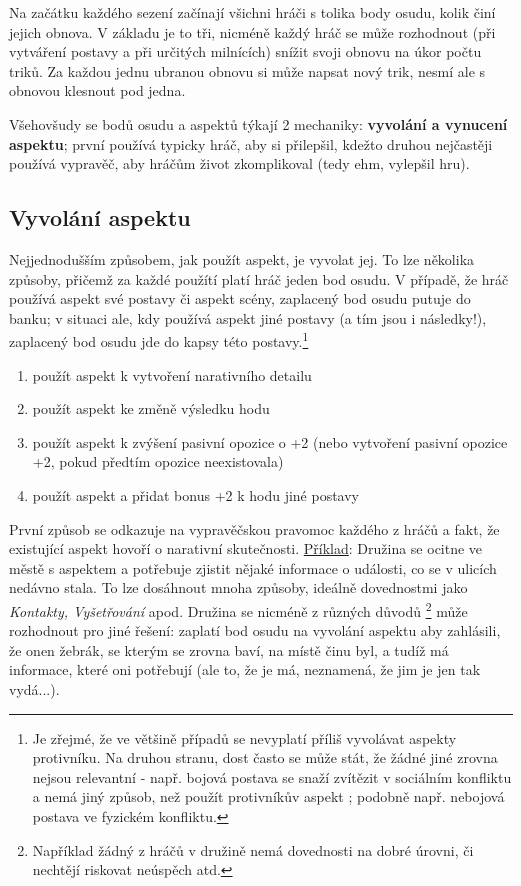 Na začátku každého sezení začínají všichni hráči s tolika body osudu, kolik činí jejich obnova. V základu je to tři, nicméně každý hráč se může rozhodnout (při vytváření postavy a při určitých milnících) snížit svoji obnovu na úkor počtu triků. Za každou jednu ubranou obnovu si může napsat nový trik, nesmí ale s obnovou klesnout pod jedna.

Všehovšudy se bodů osudu a aspektů týkají 2 mechaniky: \textbf{vyvolání a vynucení aspektu}; první používá typicky hráč, aby si přilepšil, kdežto druhou nejčastěji používá vypravěč, aby hráčům život zkomplikoval (tedy ehm, vylepšil hru).

\subsection{Vyvolání aspektu}
\label{sec:vyvolani-aspektu}

Nejjednodušším způsobem, jak použít aspekt, je vyvolat jej. To lze několika způsoby, přičemž za každé použítí platí hráč jeden bod osudu. V případě, že hráč používá aspekt své postavy či aspekt scény, zaplacený bod osudu putuje do banku; v situaci ale, kdy používá aspekt jiné postavy (a tím jsou i následky!), zaplacený bod osudu jde do kapsy této postavy.\footnote{Je zřejmé, že ve většině případů se nevyplatí příliš vyvolávat aspekty protivníku. Na druhou stranu, dost často se může stát, že žádné jiné zrovna nejsou relevantní - např. bojová postava se snaží zvítězit v sociálním konfliktu a nemá jiný způsob, než použít protivníkův aspekt ; podobně např. nebojová postava ve fyzickém konfliktu.}

\begin{enumerate}
\item použít aspekt k vytvoření narativního detailu
\item použít aspekt ke změně výsledku hodu
\item použít aspekt k zvýšení pasivní opozice o +2 (nebo vytvoření pasivní opozice +2, pokud předtím opozice neexistovala)
\item použít aspekt a přidat bonus +2 k hodu jiné postavy
\end{enumerate}

První způsob se odkazuje na vypravěčskou pravomoc každého z hráčů a fakt, že existující aspekt hovoří o narativní skutečnosti. \underline{Příklad}:
Družina se ocitne ve městě s aspektem  a potřebuje zjistit nějaké informace o události, co se v ulicích nedávno stala. To lze dosáhnout mnoha způsoby, ideálně dovednostmi jako \textit{Kontakty, Vyšetřování} apod. Družina se nicméně z různých důvodů \footnote{Například žádný z hráčů v družině nemá dovednosti na dobré úrovni, či nechtějí riskovat neúspěch atd.} může rozhodnout pro jiné řešení: zaplatí bod osudu na vyvolání aspektu  aby zahlásili, že onen žebrák, se kterým se zrovna baví, na místě činu byl, a tudíž má informace, které oni potřebují (ale to, že je má, neznamená, že jim je jen tak vydá...).\\


